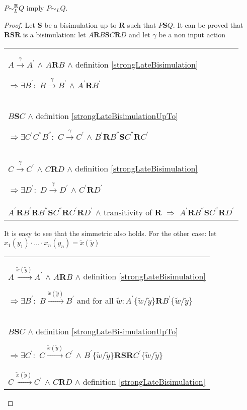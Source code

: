\begin{proposition}
  $P \sim_{L}^{\mathbf{R}} Q$ imply $P \sim_{L} Q$.
   \begin{proof}
     Let $\mathbf{S}$ be a bisimulation up to $\mathbf{R}$ such that $P \mathbf{S} Q$. It can be proved that $\mathbf{R} \mathbf{S} \mathbf{R}$ is a bisimulation: let $A \mathbf{R} B \mathbf{S} C \mathbf{R} D$ and let $\gamma$ be a non input action
     \begin{center}
       \begin{tabular}{l}
 	$A \xrightarrow{\gamma} A^{'}$ $\wedge$ $A \mathbf{R} B$ $\wedge$ definition \ref{strongLateBisimulation}
       
 	$\Rightarrow \exists B^{'}:$ $B \xrightarrow{\gamma} B^{'}$ $\wedge$ $A^{'} \mathbf{R} B^{'}$
       \\
 	$B \mathbf{S} C$ $\wedge$ definition \ref{strongLateBisimulationUpTo}
       
 	$\Rightarrow \exists C^{'} C^{''} B^{''}:$ $C \xrightarrow{\gamma} C^{'}$ $\wedge$ $B^{'} \mathbf{R} B^{''} \mathbf{S} C^{''} \mathbf{R} C^{'}$
       \\
 	$C \xrightarrow{\gamma} C^{'}$ $\wedge$ $C \mathbf{R} D$ $\wedge$ definition \ref{strongLateBisimulation} 
       
	$\Rightarrow \exists D^{'}:$ $D \xrightarrow{\gamma} D^{'}$ $\wedge$ $C^{'}\mathbf{R} D^{'}$
       \\
	$A^{'} \mathbf{R} B^{'} \mathbf{R} B^{''} \mathbf{S} C^{''} \mathbf{R} C^{'} \mathbf{R} D^{'}$ $\wedge$ transitivity of $\mathbf{R}$
	$\Rightarrow$ $A^{'} \mathbf{R} B^{''} \mathbf{S} C^{''} \mathbf{R} D^{'}$
      \end{tabular}
    \end{center}
    It is easy to see that the simmetric also holds. For the other case: let $x_{1}(y_{1}) \cdot \ldots \cdot x_{n}(y_{n})= \tilde{x}(\tilde{y})$
     \begin{center}
       \begin{tabular}{l}
 	$A \xrightarrow{\tilde{x}(\tilde{y})} A^{'}$ $\wedge$ $A \mathbf{R} B$ $\wedge$ definition \ref{strongLateBisimulation}
       
 	$\Rightarrow \exists B^{'}:$ $B \xrightarrow{\tilde{x}(\tilde{y})} B^{'}$ and for all $\tilde{w}:A^{'}\{\tilde{w}/\tilde{y}\} \mathbf{R} B^{'}\{\tilde{w}/\tilde{y}\}$
       \\
 	$B \mathbf{S} C$ $\wedge$ definition \ref{strongLateBisimulationUpTo}
       
 	$\Rightarrow \exists C^{'}:$ $C \xrightarrow{\tilde{x}(\tilde{y})} C^{'}$ $\wedge$ $B^{'}\{\tilde{w}/\tilde{y}\} \mathbf{R} \mathbf{S} \mathbf{R} C^{'}\{\tilde{w}/\tilde{y}\}$
       \\
 	$C \xrightarrow{\tilde{x}(\tilde{y})} C^{'}$ $\wedge$ $C \mathbf{R} D$ $\wedge$ definition \ref{strongLateBisimulation} 
       

\end{tabular}
\end{center}
\end{proof}
\end{proposition}
